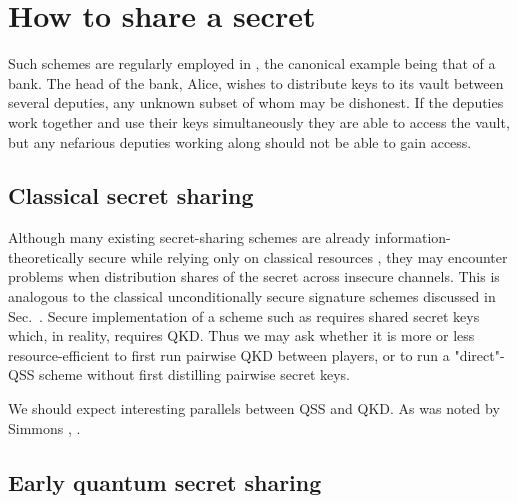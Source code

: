 \section{How to share a secret}
Such schemes are regularly employed in , the canonical example being that of a bank. The head of the bank, Alice, wishes to distribute keys to its vault between several deputies, any unknown subset of whom may be dishonest. If the deputies work together and use their keys simultaneously they are able to access the vault, but any nefarious deputies working along should not be able to gain access.

\subsection*{Classical secret sharing}
Although many existing secret-sharing schemes are already information-theoretically secure while relying only on classical resources , they may encounter problems when distribution shares of the secret across insecure channels.  This is analogous to the classical unconditionally secure signature schemes discussed in Sec.~. Secure implementation of a scheme such as  requires shared secret keys which, in reality, requires QKD. Thus we may ask whether it is more or less resource-efficient to first run pairwise QKD between players, or to run a "direct"-QSS scheme without first distilling pairwise secret keys.

We should expect interesting parallels between QSS and QKD. As was noted by Simmons , .





\subsection*{Early quantum secret sharing}


